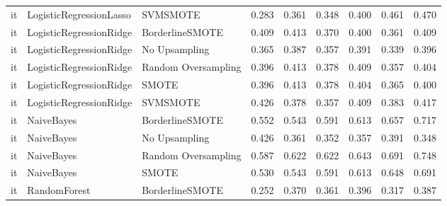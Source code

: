 \begin{tabular}{lllllllll}
      it &      LogisticRegressionLasso &            SVMSMOTE & 0.283 &                     0.361 &                 0.348 &                  0.400 &                                   0.461 &     0.470 \\
      it &      LogisticRegressionRidge &     BorderlineSMOTE & 0.409 &                     0.413 &                 0.370 &                  0.400 &                                   0.361 &     0.409 \\
      it &      LogisticRegressionRidge &       No Upsampling & 0.365 &                     0.387 &                 0.357 &                  0.391 &                                   0.339 &     0.396 \\
      it &      LogisticRegressionRidge & Random Oversampling & 0.396 &                     0.413 &                 0.378 &                  0.409 &                                   0.357 &     0.404 \\
      it &      LogisticRegressionRidge &               SMOTE & 0.396 &                     0.413 &                 0.378 &                  0.404 &                                   0.365 &     0.400 \\
      it &      LogisticRegressionRidge &            SVMSMOTE & 0.426 &                     0.378 &                 0.357 &                  0.409 &                                   0.383 &     0.417 \\
      it &                   NaiveBayes &     BorderlineSMOTE & 0.552 &                     0.543 &                 0.591 &                  0.613 &                                   0.657 &     0.717 \\
      it &                   NaiveBayes &       No Upsampling & 0.426 &                     0.361 &                 0.352 &                  0.357 &                                   0.391 &     0.348 \\
      it &                   NaiveBayes & Random Oversampling & 0.587 &                     0.622 &                 0.622 &                  0.643 &                                   0.691 &     0.748 \\
      it &                   NaiveBayes &               SMOTE & 0.530 &                     0.543 &                 0.591 &                  0.613 &                                   0.648 &     0.691 \\
      it &                 RandomForest &     BorderlineSMOTE & 0.252 &                     0.370 &                 0.361 &                  0.396 &                                   0.317 &     0.387 \\

\end{tabular}
